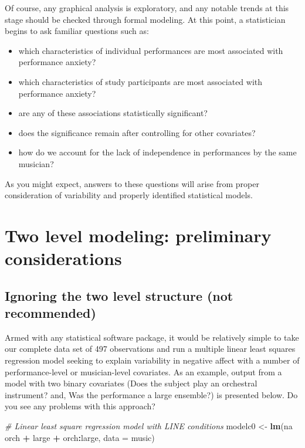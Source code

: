 \documentclass[
]{krantz}
\newenvironment{Shaded}{\begin{snugshade}}{\end{snugshade}}
\newcommand{\CommentTok}[1]{\textcolor[rgb]{0.37,0.37,0.37}{\textit{#1}}}
\newcommand{\DataTypeTok}[1]{\textcolor[rgb]{0.27,0.27,0.27}{#1}}
\newcommand{\KeywordTok}[1]{\textcolor[rgb]{0.27,0.27,0.27}{\textbf{#1}}}
\newcommand{\NormalTok}[1]{#1}
\newcommand{\OperatorTok}[1]{\textcolor[rgb]{0.43,0.43,0.43}{\textbf{#1}}}
\newcommand{\StringTok}[1]{\textcolor[rgb]{0.5,0.5,0.5}{#1}}
\providecommand{\tightlist}{%
  \setlength{\itemsep}{0pt}\setlength{\parskip}{0pt}}
\begin{document}
Of course, any graphical analysis is exploratory, and any notable trends at this stage should be checked through formal modeling. At this point, a statistician begins to ask familiar questions such as:

\begin{itemize}
\tightlist
\item
  which characteristics of individual performances are most associated with performance anxiety?
\item
  which characteristics of study participants are most associated with performance anxiety?
\item
  are any of these associations statistically significant?
\item
  does the significance remain after controlling for other covariates?
\item
  how do we account for the lack of independence in performances by the same musician?
\end{itemize}

As you might expect, answers to these questions will arise from proper consideration of variability and properly identified statistical models.

\hypertarget{twolevelmodeling}{%
\section{Two level modeling: preliminary considerations}\label{twolevelmodeling}}

\hypertarget{multregr}{%
\subsection{Ignoring the two level structure (not recommended)}\label{multregr}}

Armed with any statistical software package, it would be relatively simple to take our complete data set of 497 observations and run a multiple linear least squares regression model seeking to explain variability in negative affect with a number of performance-level or musician-level covariates. As an example, output from a model with two binary covariates (Does the subject play an orchestral instrument? and, Was the performance a large ensemble?) is presented below. Do you see any problems with this approach?

\begin{Shaded}
\begin{Highlighting}[]
\CommentTok{# Linear least square regression model with LINE conditions}
\NormalTok{modelc0 <-}\StringTok{ }\KeywordTok{lm}\NormalTok{(na }\OperatorTok{~}\StringTok{ }\NormalTok{orch }\OperatorTok{+}\StringTok{ }\NormalTok{large }\OperatorTok{+}\StringTok{ }\NormalTok{orch}\OperatorTok{:}\NormalTok{large, }\DataTypeTok{data =}\NormalTok{ music)}
\end{Highlighting}
\end{Shaded}
\end{document}
